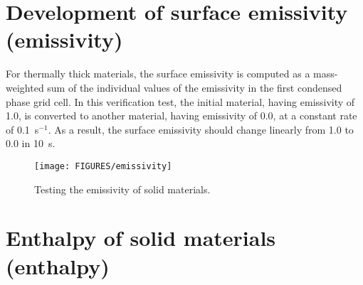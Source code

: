 \documentclass[11pt]{book}
\begin{document}
%

\section{Development of surface emissivity (\texorpdfstring{{\bf emissivity}}{emissivity})}

For thermally thick materials, the surface emissivity is computed as a
mass-weighted sum of the individual values of the emissivity
in the first condensed phase grid cell. In this verification test, the
initial material, having emissivity of 1.0, is converted to another
material, having emissivity of 0.0, at a constant rate of 0.1~s$^{-1}$. As a
result, the surface emissivity should change linearly from 1.0 to 0.0 in 10~s.

\begin{figure}[ht]
\begin{center}
\texttt{[image: FIGURES/emissivity]}
\end{center}
\caption[The {\bf emissivity} test case.]{Testing the emissivity of solid materials.}
\label{emissivity}
\end{figure}



\section{Enthalpy of solid materials (\texorpdfstring{{\bf enthalpy}}{enthalpy})}
\end{document}
